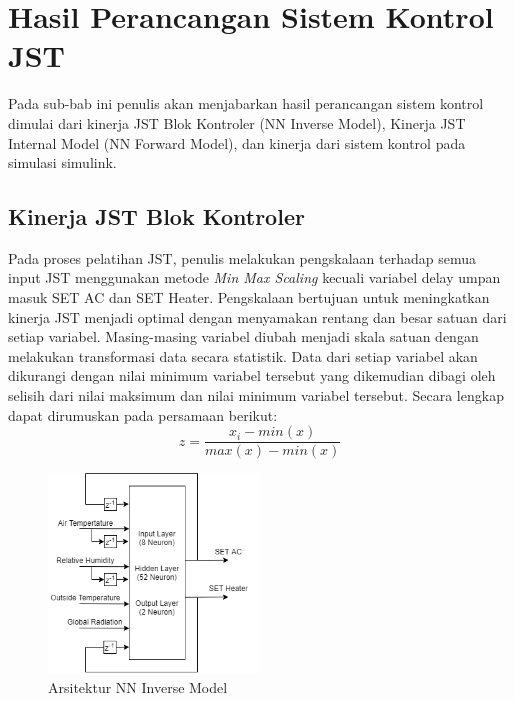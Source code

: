 \section{Hasil Perancangan Sistem Kontrol JST}

Pada sub-bab ini penulis akan menjabarkan hasil perancangan sistem kontrol dimulai dari kinerja JST Blok Kontroler (NN Inverse Model), Kinerja JST Internal Model (NN Forward Model), dan kinerja dari sistem kontrol pada simulasi simulink.

\subsection{Kinerja JST Blok Kontroler}

Pada proses pelatihan JST, penulis melakukan pengskalaan terhadap semua input JST menggunakan metode \textit{Min Max Scaling} kecuali variabel delay umpan masuk SET AC dan SET Heater. Pengskalaan bertujuan untuk meningkatkan kinerja JST menjadi optimal dengan menyamakan rentang dan besar satuan dari setiap variabel. Masing-masing variabel diubah menjadi skala satuan dengan melakukan transformasi data secara statistik. Data dari setiap variabel akan dikurangi dengan nilai minimum variabel tersebut yang dikemudian dibagi oleh selisih dari nilai maksimum dan nilai minimum variabel tersebut. Secara lengkap dapat dirumuskan pada persamaan berikut:
\begin{equation} \label{eq:5:MinMaxScaler}
z = \frac{x_i - min(x)}{max(x) - min(x)}
\end{equation}

\begin{figure}[!h]
	\centering
	\includegraphics[width=0.5\textwidth]{figures/NNInverseModelDesign}
	\caption{Arsitektur NN Inverse Model}
	\label{fig:5:NNInverseModelDesign}
\end{figure}

